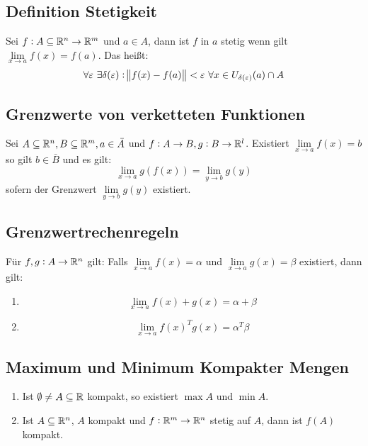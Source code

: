 \subsection{Definition Stetigkeit}
Sei $f: A \subseteq \mathbb{R}^n \rightarrow \mathbb{R}^m$ und $a \in A$, dann ist $f$ in $a$
stetig wenn gilt $\lim\limits_{x \rightarrow a} f(x) = f(a)$. Das heißt:
\begin{equation*}
    \forall\varepsilon\ \exists \delta(\varepsilon):
    \norm{f(x) - f(a)} < \varepsilon\ \forall x \in U_{\delta(\varepsilon)}(a)
    \cap A
\end{equation*}

\subsection{Grenzwerte von verketteten Funktionen}
Sei $A \subseteq \mathbb{R}^n, B \subseteq \mathbb{R}^m, a \in \bar{A}$ und $f: A \rightarrow B,
g: B \rightarrow \mathbb{R}^l$. Existiert $\lim\limits_{x \rightarrow a} f(x) = b$ so
gilt $b \in \bar{B}$ und es gilt:
\begin{equation*}
    \lim_{x \rightarrow a} g(f(x)) = \lim_{y \rightarrow b} g(y)
\end{equation*}
sofern der Grenzwert $\lim\limits_{y \rightarrow b} g(y)$ existiert.

\subsection{Grenzwertrechenregeln}
Für $f, g: A \rightarrow \mathbb{R}^n$ gilt: Falls $\lim\limits_{x \rightarrow a} f(x)
= \alpha$ und $\lim\limits_{x \rightarrow a} g(x) = \beta$ existiert, dann gilt:
\begin{enumerate}[label= (\alph*)]
    \item
        \begin{equation*}
            \lim_{x \rightarrow a} f(x) + g(x) = \alpha + \beta
        \end{equation*}
    \item
        \begin{equation*}
            \lim_{x \rightarrow a} {f(x)}^T g(x) = \alpha^T \beta
        \end{equation*}
\end{enumerate}

\subsection{Maximum und Minimum Kompakter Mengen}
\begin{enumerate}[label= (\alph*)]
    \item Ist $\emptyset \neq A \subseteq \mathbb{R}$ kompakt, so existiert $\max{A}$ und
        $\min{A}$.
    \item Ist $A \subseteq \mathbb{R}^n$, $A$ kompakt und $f: \mathbb{R}^m \rightarrow \mathbb{R}^n$
        stetig auf $A$, dann ist $f(A)$ kompakt.
\end{enumerate}

